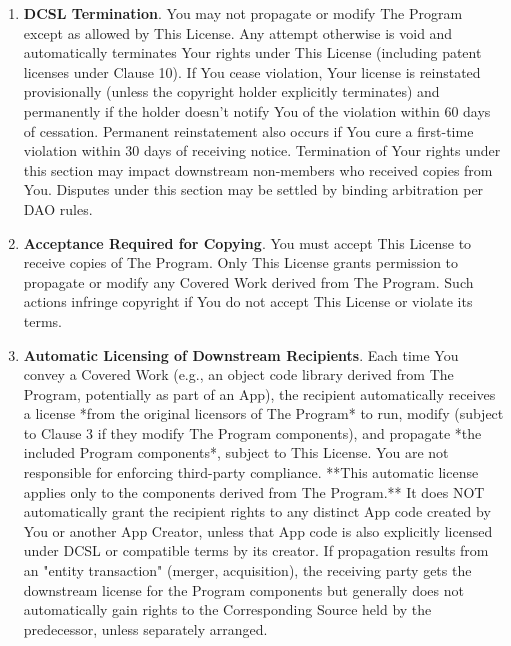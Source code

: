 \documentclass{article}
\begin{document}
\begin{enumerate}
        \item \textbf{DCSL Termination}. \label{dcsl:termination}
        You may not propagate or modify The Program except as allowed by This License. Any attempt otherwise is void and automatically terminates Your rights under This License (including patent licenses under Clause 10). If You cease violation, Your license is reinstated provisionally (unless the copyright holder explicitly terminates) and permanently if the holder doesn't notify You of the violation within 60 days of cessation. Permanent reinstatement also occurs if You cure a first-time violation within 30 days of receiving notice. Termination of Your rights under this section may impact downstream non-members who received copies from You. Disputes under this section may be settled by binding arbitration per DAO rules.

        \item \textbf{Acceptance Required for Copying}.
        You must accept This License to receive copies of The Program. Only This License grants permission to propagate or modify any Covered Work derived from The Program. Such actions infringe copyright if You do not accept This License or violate its terms.

        \item \textbf{Automatic Licensing of Downstream Recipients}. \label{dcsl:downstream}
        Each time You convey a Covered Work (e.g., an object code library derived from The Program, potentially as part of an App), the recipient automatically receives a license *from the original licensors of The Program* to run, modify (subject to Clause 3 if they modify The Program components), and propagate *the included Program components*, subject to This License. You are not responsible for enforcing third-party compliance.
        **This automatic license applies only to the components derived from The Program.** It does NOT automatically grant the recipient rights to any distinct App code created by You or another App Creator, unless that App code is also explicitly licensed under DCSL or compatible terms by its creator.
        If propagation results from an "entity transaction" (merger, acquisition), the receiving party gets the downstream license for the Program components but generally does not automatically gain rights to the Corresponding Source held by the predecessor, unless separately arranged.


\end{enumerate}
\end{document}
